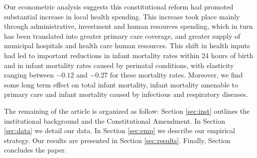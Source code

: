 Our econometric analysis suggests this constitutional reform had promoted substantial increase in local health spending. This increase took place mainly through administrative, investment and human resources spending, which in turn has been translated into greater primary care coverage, and greater supply of municipal hospitals and health care human resources. This shift in health inputs had led to important reductions in infant mortality rates within 24 hours of birth and in infant mortality rates caused by perinatal conditions, with elasticity ranging between $-0.12$ and $-0.27$ for these mortality rates. Moreover, we find some long term effect on total infant mortality, infant mortality amenable to primary care and infant mortality caused by infectious and respiratory diseases.

The remaining of the article is organized as follow: Section \ref{sec:inst} outlines the institutional background and the  Constitutional Amendment. In Section \ref{sec:data} we detail our data. In Section \ref{sec:emp} we describe our empirical strategy. Our results are presented in Section \ref{sec:results}. Finally, Section concludes the paper. 


